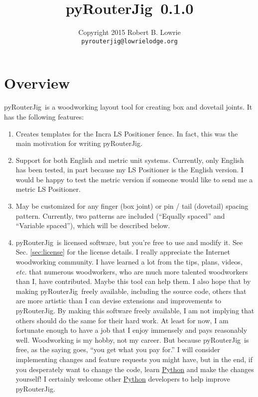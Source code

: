 \documentclass[12pt,final]{article}
\makeatletter
\newcommand{\codename}[0]{pyRouterJig}
\newcommand{\codever}[0]{{\codename~0.1.0}}
\newcommand{\email}[0]{\texttt{pyrouterjig@lowrielodge.org}}
\newcommand{\mycopyright}[0]{{Copyright 2015 Robert B. Lowrie}}
\makeatother
\begin{document}
\title{\codever}
\author{\mycopyright \\ \email}
\date{}
\maketitle

\section{Overview}

\codename~is a woodworking layout tool for creating box and dovetail
joints.  It has the following features:
\begin{enumerate}
\item Creates templates for the Incra LS Positioner fence.  In fact, this was
  the main motivation for writing \codename.
\item Support for both English and metric unit systems.  Currently, only
  English has been tested, in part because my LS Positioner is the English
  version.  I would be happy to test the metric version if someone would like
  to send me a metric LS Positioner.
\item May be customized for any finger (box joint) or pin / tail (dovetail)
  spacing pattern.  Currently, two patterns are included (``Equally spaced''
  and ``Variable spaced''), which will be described below.
\item \codename~is licensed software, but you're free to use and modify it.
  See Sec. \ref{sec:license} for the license details.  I really appreciate the
  Internet woodworking community.  I have learned a lot from the tips, plans,
  videos, \emph{etc.} that numerous woodworkers, who are much more talented
  woodworkers than I, have contributed.  Maybe this tool can help them.  I
  also hope that by making \codename~freely available, including the source
  code, others that are more artistic than I can devise extensions and
  improvements to \codename.  By making this software freely available, I am
  not implying that others should do the same for their hard work.  At least
  for now, I am fortunate enough to have a job that I enjoy immensely and pays
  reasonably well.  Woodworking is my hobby, not my career.  But because
  \codename~is free, as the saying goes, ``you get what you pay for.''  I will
  consider implementing changes and feature requests you might have, but in
  the end, if you desperately want to change the code, learn
  \href{http://www.python.org}{Python} and make the changes yourself!  I
  certainly welcome other \href{http://www.python.org}{Python} developers to
  help improve \codename.
\end{enumerate}
\end{document}
